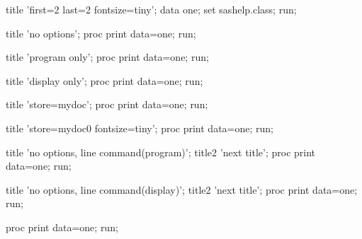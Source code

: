 \documentclass[a4paper]{article}
\begin{document}
\begin{Datastep}[first=2, last=2, fontsize=tiny]
title 'first=2 last=2 fontsize=tiny';
data one;
  set sashelp.class;
run;
\end{Datastep}

\begin{Sascode}
title 'no options';
proc print data=one;
run;
\end{Sascode}

\begin{Sascode}[program]
title 'program only';
proc print data=one;
run;
\end{Sascode}

\begin{Sascode}[display]
title 'display only';
proc print data=one;
run;
\end{Sascode}


\begin{Sascode}[store=mydoc]
title 'store=mydoc';
proc print data=one;
run;
\end{Sascode}

\begin{Sascode}[store=mydoc0, fontsize=tiny]
title 'store=mydoc0 fontsize=tiny';
proc print data=one;
run;
\end{Sascode}

\begin{Sascode}
title 'no options, line command(program)';
title2 'next title';
proc print data=one;
run;
\end{Sascode}

\begin{Sascode}
title 'no options, line command(display)';
title2 'next title';
proc print data=one;
run;
\end{Sascode}

\begin{Sascode}
proc print data=one;
run;
\end{Sascode}






\end{document}
